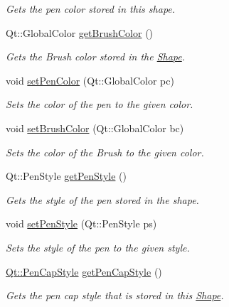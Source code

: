 \begin{DoxyCompactItemize}
\begin{DoxyCompactList}\small\item\em Gets the pen color stored in this shape. \end{DoxyCompactList}\item 
Qt\+::\+Global\+Color \hyperlink{classSquare_a8f504b5de9fc6cbc7aedc90c6559cb58}{get\+Brush\+Color} ()
\begin{DoxyCompactList}\small\item\em Gets the Brush color stored in the \hyperlink{classShape}{Shape}. \end{DoxyCompactList}\item 
void \hyperlink{classSquare_aea0a3ccc55caacf339d9270d102b75c8}{set\+Pen\+Color} (Qt\+::\+Global\+Color pc)
\begin{DoxyCompactList}\small\item\em Sets the color of the pen to the given color. \end{DoxyCompactList}\item 
void \hyperlink{classSquare_ad649b56a35dba222144299a0a4e90483}{set\+Brush\+Color} (Qt\+::\+Global\+Color bc)
\begin{DoxyCompactList}\small\item\em Sets the color of the Brush to the given color. \end{DoxyCompactList}\item 
Qt\+::\+Pen\+Style \hyperlink{classSquare_a8acc57d1601adeb0800648799fc8beae}{get\+Pen\+Style} ()
\begin{DoxyCompactList}\small\item\em Gets the style of the pen stored in the shape. \end{DoxyCompactList}\item 
void \hyperlink{classSquare_a912efb5a33db0a697a275fccedf69523}{set\+Pen\+Style} (Qt\+::\+Pen\+Style ps)
\begin{DoxyCompactList}\small\item\em Sets the style of the pen to the given style. \end{DoxyCompactList}\item 
\hyperlink{shape__input__file__specs_8txt_a622efdcfef6789d4367974d2fe79019e}{Qt\+::\+Pen\+Cap\+Style} \hyperlink{classSquare_a3b91e8b3b03d2a6125836a5477cfc9be}{get\+Pen\+Cap\+Style} ()
\begin{DoxyCompactList}\small\item\em Gets the pen cap style that is stored in this \hyperlink{classShape}{Shape}. \end{DoxyCompactList}\item 

\end{DoxyCompactItemize}
